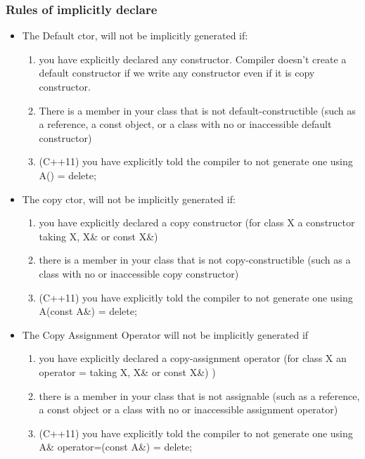 \documentclass[a4paper,11pt,twoside]{book}
\begin{document}
\subsubsection{Rules of implicitly declare }
\begin{itemize}
	\item The Default ctor, will not be implicitly generated if:
	
\begin{enumerate}
	\item you have explicitly declared any constructor.  Compiler doesn't create a default constructor if we write any constructor even if it is copy constructor.

	\item There is a member in your class that is not default-constructible (such as a reference, a const object, or a class with no or inaccessible default constructor)

	\item (C++11) you have explicitly told the compiler to not generate one using A() = delete;
\end{enumerate}

\item The copy ctor, will not be implicitly generated if:
\begin{enumerate}
	\item you have explicitly declared a copy constructor (for class X a constructor taking X, X\& or const X\&)
	
	\item there is a member in your class that is not copy-constructible (such as a class with no or inaccessible copy constructor)
	
	\item (C++11) you have explicitly told the compiler to not generate one using A(const A\&) = delete;
\end{enumerate}


\item The Copy Assignment Operator will not be implicitly generated if
\begin{enumerate}
\item you have explicitly declared a copy-assignment operator (for class X an operator = taking X, X\& or const X\&) )
\item there is a member in your class that is not assignable (such as a reference, a const object or a class with no or inaccessible assignment operator)
\item (C++11) you have explicitly told the compiler to not generate one using A\& operator=(const A\&) = delete;
\end{enumerate}



\end{itemize}
\end{document}
